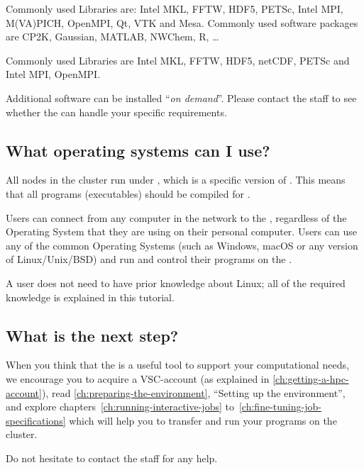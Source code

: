 Commonly used Libraries are: Intel MKL, FFTW, HDF5, PETSc, Intel MPI,
M(VA)PICH, OpenMPI, Qt, VTK and Mesa.
\fi
\ifbrussel
Commonly used software packages are CP2K, Gaussian, MATLAB, NWChem, R, \ldots

Commonly used Libraries are Intel MKL, FFTW, HDF5, netCDF, PETSc and Intel MPI,
OpenMPI.
\fi

Additional software can be installed ``\emph{on demand}''. Please contact the
\hpc staff to see whether the \hpc can handle your specific requirements.

\subsection{What operating systems can I use?}
\label{sec:what-operating-systems-can-i-use}

All nodes in the \hpc cluster run under \operatingsystem, which is a specific
version of \operatingsystembase. This means that all programs (executables)
should be compiled for \operatingsystem.

Users can connect from any computer in the \university network to the
\hpc, regardless of the Operating System that they are using on their personal
computer.
Users can use any of the common Operating Systems (such as Windows, macOS or
any version of Linux/Unix/BSD) and run and control their programs on the \hpc.

A user does not need to have prior knowledge about Linux; all of the required
knowledge is explained in this tutorial.

\subsection{What is the next step?}
\label{sec:what-is-the-next-step}

When you think that the \hpc is a useful tool to support your computational
needs, we encourage you to acquire a VSC-account (as explained in
\autoref{ch:getting-a-hpc-account}), read
\autoref{ch:preparing-the-environment}, ``Setting up the environment'', and
explore chapters~\ref{ch:running-interactive-jobs}
to~\ref{ch:fine-tuning-job-specifications} which will help you to transfer and
run your programs on the \hpc cluster.

Do not hesitate to contact the \hpc staff for any help.
